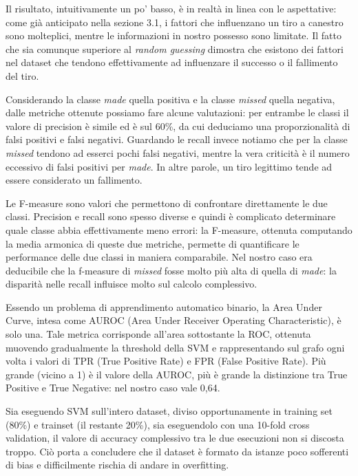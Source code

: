 \par
Il risultato, intuitivamente un po' basso, è in realtà in linea con le aspettative: come già anticipato nella sezione 3.1, i fattori che influenzano un tiro a canestro sono molteplici, mentre le informazioni in nostro possesso sono limitate. Il fatto che sia comunque  superiore al \textit{random guessing} dimostra che esistono dei fattori nel dataset che tendono effettivamente ad influenzare il successo o il fallimento del tiro.

\par
Considerando la classe \textit{made} quella positiva e la classe \textit{missed} quella negativa, dalle metriche ottenute possiamo fare alcune valutazioni: per entrambe le classi il valore di precision è simile ed è sul 60\%, da cui deduciamo una proporzionalità di falsi positivi e falsi negativi.
Guardando le recall invece notiamo che per la classe \textit{missed} tendono ad esserci pochi falsi negativi, mentre la vera criticità è il numero eccessivo di falsi positivi per \textit{made}. In altre parole, un tiro legittimo tende ad essere considerato un fallimento.

Le F-measure sono valori che permettono di confrontare direttamente le due classi. Precision e recall sono spesso diverse e quindi è complicato determinare quale classe abbia effettivamente meno errori: la F-measure, ottenuta computando la media armonica di queste due metriche, permette di quantificare le performance delle due classi in maniera comparabile. Nel nostro caso era deducibile che la f-measure di \textit{missed} fosse molto più alta di quella di \textit{made}: la disparità nelle recall influisce molto sul calcolo complessivo.

Essendo un problema di apprendimento automatico binario, la Area Under Curve, intesa come AUROC (Area Under Receiver Operating Characteristic), è solo una. Tale metrica corrisponde all'area sottostante la ROC, ottenuta muovendo gradualmente la threshold della SVM e rappresentando sul grafo ogni volta i valori di TPR (True Positive Rate) e FPR (False Positive Rate).
Più grande (vicino a 1) è il valore della AUROC, più è grande la distinzione tra True Positive e True Negative: nel nostro caso vale 0,64.

\par
Sia eseguendo SVM sull'intero dataset, diviso opportunamente in training set (80\%) e trainset (il restante 20\%), sia eseguendolo con una 10-fold cross validation, il valore di accuracy complessivo tra le due esecuzioni non si discosta troppo. Ciò porta a concludere che il dataset è formato da istanze poco sofferenti di bias e difficilmente rischia di andare in overfitting.

